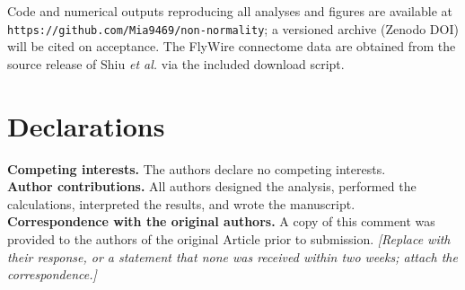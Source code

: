 \documentclass[pdflatex,sn-nature]{sn-jnl}
\begin{document}
\backmatter

Code and numerical outputs reproducing all analyses and figures are available at
\texttt{https://github.com/Mia9469/non-normality}; a versioned archive (Zenodo
DOI) will be cited on acceptance. The FlyWire connectome data are obtained from
the source release of Shiu \emph{et al.}\cite{shiu2024} via the included download
script.

\section*{Declarations}
\noindent\textbf{Competing interests.} The authors declare no competing interests.\\[0.3em]
\noindent\textbf{Author contributions.} All authors designed the analysis,
performed the calculations, interpreted the results, and wrote the
manuscript.\\[0.3em]
\noindent\textbf{Correspondence with the original authors.} A copy of this
comment was provided to the authors of the original Article prior to submission.
\emph{[Replace with their response, or a statement that none was received within
two weeks; attach the correspondence.]}


\end{document}
